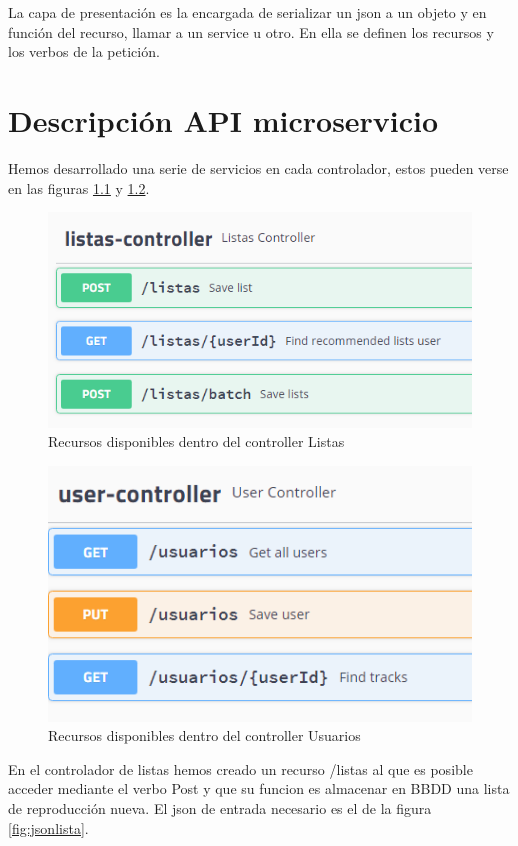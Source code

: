 \documentclass[12pt]{report} %
\begin{document}
 La capa de presentación es la encargada de serializar un json a un objeto y en función del recurso, llamar a un service u otro. En ella se definen los recursos y los verbos de la petición. 
 
\chapter{Descripción API microservicio}

Hemos desarrollado una serie de servicios en cada controlador, estos pueden verse en las figuras \ref{fig:controllerlistas} y \ref{fig:controllerusuarios}. 

\begin{figure}
	\centering
	\includegraphics[width=0.7\linewidth]{imagenes/controllerListas}
	\caption{Recursos disponibles dentro del controller Listas}
	\label{fig:controllerlistas}
\end{figure}


\begin{figure}
	\centering
	\includegraphics[width=0.7\linewidth]{imagenes/controllerUsuarios}
	\caption{Recursos disponibles dentro del controller Usuarios}
	\label{fig:controllerusuarios}
\end{figure}

En el controlador de listas hemos creado un recurso /listas al que es posible acceder mediante el verbo Post  y que su funcion es almacenar en BBDD una lista de reproducción nueva. El json de entrada necesario es el de la figura \ref{fig:jsonlista}.
\end{document}
